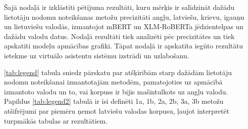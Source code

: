 
Šajā nodaļā ir izklāstīti pētījuma rezultāti, kuru mērķis ir salīdzināt dažādu lietotāju nodomu noteikšanas metožu precizitāti angļu, latviešu, krievu, igauņu un lietuviešu valodās, izmantojot mBERT un XLM-RoBERTa jēdzientelpas un dažādu valodu datus. Nodaļā rezultāti tiek analizēti pēc precizitātes un tiek apskatīti modeļu apmācības grafiki. Tāpat nodaļā ir apskatīta iegūto rezultātu ietekme uz virtuālo asistentu sistēmu izstrādi un uzlabošanu.

\ref{tab:legend} tabula sniedz pārskatu par atšķirībām starp dažādām lietotāju nodomu noteikšanai izmantotajām metodēm, pamatojoties uz apmācībā izmantoto valodu un to, vai korpuss ir bijis mašīntulkots uz angļu valodu. Papildus \ref{tab:legend2} tabulā ir īsi definēti 1a, 1b, 2a, 2b, 3a, 3b metožu atšifrējumi par piemēru ņemot latviešu valodas korpusu, ļaujot interpretēt turpmākās tabulas ar rezultātiem.




